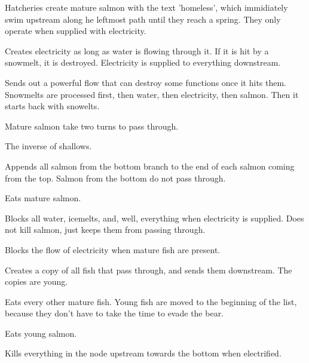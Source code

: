 \documentclass[10pt]{article}
\begin{document}

Hatcheries create mature salmon with the text 'homeless', which immidiately swim upstream along he leftmost path until they reach a spring. They only operate when supplied with electricity.


Creates electricity as long as water is flowing through it. If it is hit by a snowmelt, it is destroyed. Electricity is supplied to everything downstream.


Sends out a powerful flow that can destroy some functions once it hits them. Snowmelts are processed first, then water, then electricity, then salmon. Then it starts back with snowelts.


Mature salmon take two turns to pass through.


The inverse of shallows.


Appends all salmon from the bottom branch to the end of each salmon coming from the top. Salmon from the bottom do not pass through.


Eats mature salmon.


Blocks all water, icemelts, and, well, everything when electricity is supplied. Does not kill salmon, just keeps them from passing through.


Blocks the flow of electricity when mature fish are present.


Creates a copy of all fish that pass through, and sends them downstream. The copies are young.


Eats every other mature fish. Young fish are moved to the beginning of the list, because they don't have to take the time to evade the bear.


Eats young salmon.


Kills everything in the node upstream towards the bottom when electrified.
\end{document}
